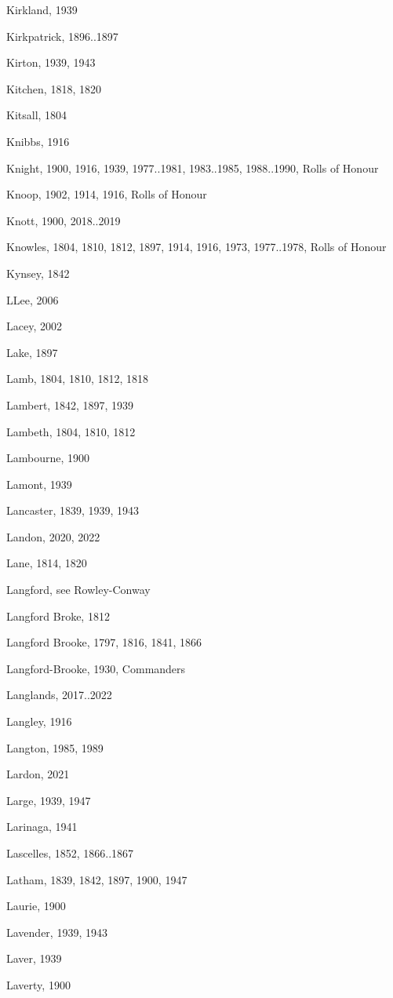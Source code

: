 {\begin{theindex}
\item Kirkland, 1939
\item Kirkpatrick, 1896..1897
\item Kirton, 1939, 1943
\item Kitchen, 1818, 1820
\item Kitsall, 1804
\item Knibbs, 1916
\item Knight, 1900, 1916, 1939, 1977..1981, 1983..1985, 1988..1990, Rolls of Honour
\item Knoop, 1902, 1914, 1916, Rolls of Honour
\item Knott, 1900, 2018..2019
\item Knowles, 1804, 1810, 1812, 1897, 1914, 1916, 1973, 1977..1978, Rolls of Honour
\item Kynsey, 1842
\item LLee, 2006
\item Lacey, 2002
\item Lake, 1897
\item Lamb, 1804, 1810, 1812, 1818
\item Lambert, 1842, 1897, 1939
\item Lambeth, 1804, 1810, 1812
\item Lambourne, 1900
\item Lamont, 1939
\item Lancaster, 1839, 1939, 1943
\item Landon, 2020, 2022
\item Lane, 1814, 1820
\item Langford, see Rowley-Conway
\item Langford Broke, 1812
\item Langford Brooke, 1797, 1816, 1841, 1866
\item Langford-Brooke, 1930, Commanders
\item Langlands, 2017..2022
\item Langley, 1916
\item Langton, 1985, 1989
\item Lardon, 2021
\item Large, 1939, 1947
\item Larinaga, 1941
\item Lascelles, 1852, 1866..1867
\item Latham, 1839, 1842, 1897, 1900, 1947
\item Laurie, 1900
\item Lavender, 1939, 1943
\item Laver, 1939
\item Laverty, 1900

\end{theindex}}
